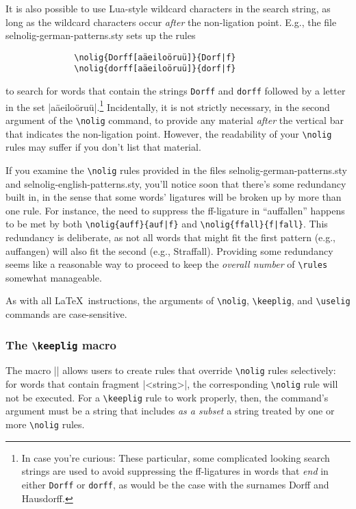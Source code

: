 \documentclass[11pt]{article}
\newcommand{\pkg}[1]{\textsf{#1}}
\newcommand{\opt}[1]{\texttt{#1}}
\newcommand{\cmmd}[1]{\texttt{\textbackslash #1}}
\begin{document}
It is also possible to use Lua-style wildcard characters in the search string, as long as the wildcard characters occur \emph{after} the non-ligation point. E.g., the file \pkg{selnolig-german-patterns.sty} sets up the rules 
\begin{Verbatim}
              \nolig{Dorff[aäeiloöruü]}{Dorf|f}
              \nolig{dorff[aäeiloöruü]}{dorf|f}
\end{Verbatim}
to search for words that contain the strings \opt{Dorff} and \opt{dorff} followed by a letter in the set |aäeiloöruü|.\footnote{In case you're curious: These particular, some complicated looking search strings are used to avoid suppressing the ff-ligatures in words that \emph{end} in either \opt{Dorff} or \opt{dorff}, as would be the case with the surnames Dorff and Hausdorff.} Incidentally, it is not strictly necessary, in the second argument of the \cmmd{nolig} command, to provide any material \emph{after} the vertical bar that indicates the non-ligation point. However, the readability of your \cmmd{nolig} rules may suffer if you don't list that material.

If you examine the \cmmd{nolig} rules provided in the files \pkg{selnolig-german-patterns.sty} and \pkg{selnolig-english-patterns.sty}, you'll notice soon that there's some redundancy built in, in the sense that some words' ligatures will be broken up by more than one rule. For instance, the need to suppress the ff-ligature in \enquote{auffallen} happens to be met by both \Verb+\nolig{auff}{auf|f}+ and \Verb+\nolig{ffall}{f|fall}+. This redundancy is deliberate, as not all words that might fit the first pattern (e.g., auffangen) will also fit the second (e.g., Straffall). Providing some redundancy seems like a reasonable way to proceed to keep the \emph{overall number} of \cmmd{rules} somewhat manageable.

As with all \LaTeX\ instructions, the arguments of  \cmmd{nolig}, \cmmd{keeplig}, and \cmmd{uselig} commands are case-sensitive. 

\subsubsection{The \cmmd{keeplig} macro} 
\label{sec:keeplig}


The macro || allows users to create rules that override \cmmd{nolig} rules selectively: for words that contain fragment |<string>|, the corresponding \cmmd{nolig} rule will not be executed. For a \cmmd{keeplig} rule to work properly, then, the command's argument must be a string that includes \emph{as a subset} a string treated by one or more \cmmd{nolig} rules.
\end{document}
